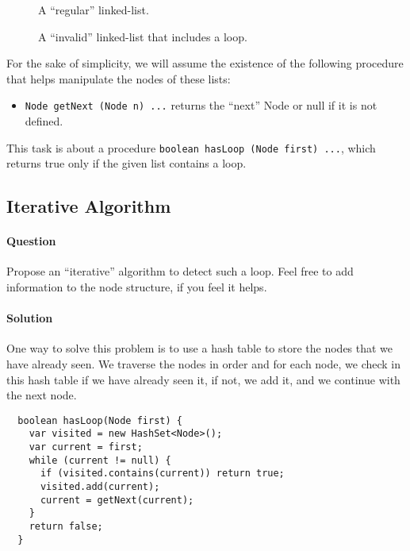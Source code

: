\documentclass{article}
\begin{document}
\begin{figure}[htbp]
  \begin{center}
    
  \end{center}
  \caption{A ``regular'' linked-list.}
  \label{fig:list}
\end{figure}

\begin{figure}[htbp]
  \begin{center}
    
  \end{center}
  \caption{A ``invalid'' linked-list that includes a loop.}
  \label{fig:list-loop}
\end{figure}

For the sake of simplicity, we will assume the existence of the
following procedure that helps manipulate the nodes of these
lists:
\begin{itemize}
\item \texttt{Node getNext (Node n) {...}} returns the ``next''
  Node or null if it is not defined.
\end{itemize}

This task is about a procedure \texttt{boolean hasLoop (Node
  first) {...}}, which returns true only if the given list contains a
loop.

\subsection{Iterative Algorithm}

\paragraph{Question} Propose an ``iterative'' algorithm to detect such
a loop. Feel free to add information to the node structure, if you
feel it helps.

\paragraph{Solution}
One way to solve this problem is to use a hash table to store the
nodes that we have already seen. We traverse the nodes in order and
for each node, we check in this hash table if we have already seen it, if
not, we add it, and we continue with the next node.

\begin{verbatim}
  boolean hasLoop(Node first) {
    var visited = new HashSet<Node>();
    var current = first;
    while (current != null) {
      if (visited.contains(current)) return true;
      visited.add(current);
      current = getNext(current);
    }
    return false;
  }
\end{verbatim}
\end{document}
